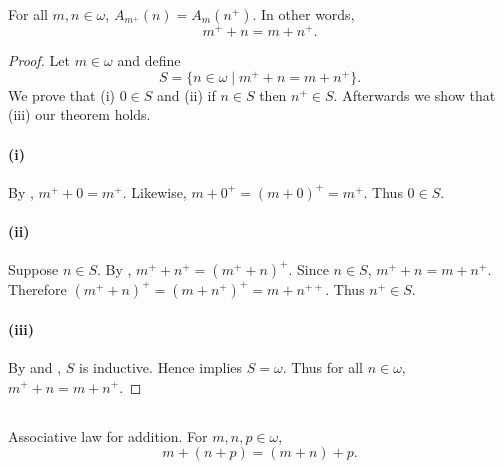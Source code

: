 \documentclass{report}
\begin{document}
\begin{lemma}

  For all $m, n \in \omega$, $A_{m^+}(n) = A_m(n^+)$.
  In other words, $$m^+ + n = m + n^+.$$

\end{lemma}

\begin{proof}


  Let $m \in \omega$ and define
    $$S = \{n \in \omega \mid m^+ + n = m + n^+\}.$$
  We prove that (i) $0 \in S$ and (ii) if $n \in S$ then $n^+ \in S$.
  Afterwards we show that (iii) our theorem holds.

  \paragraph{(i)}%

    By , $m^+ + 0 = m^+$.
    Likewise, $m + 0^+ = (m + 0)^+ = m^+$.
    Thus $0 \in S$.

  \paragraph{(ii)}%

    Suppose $n \in S$.
    By , $m^+ + n^+ = (m^+ + n)^+$.
    Since $n \in S$, $m^+ + n = m + n^+$.
    Therefore $(m^+ + n)^+ = (m + n^+)^+ = m + n^{++}$.
    Thus $n^+ \in S$.

  \paragraph{(iii)}%

    By  and , $S$ is inductive.
    Hence  implies $S = \omega$.
    Thus for all $n \in \omega$, $m^+ + n = m + n^+$.

\end{proof}

\subsection{}%
\label{sub:theorem-4k-1}

\begin{theorem}[4K-1]

  Associative law for addition.
  For $m, n, p \in \omega$, $$m + (n + p) = (m + n) + p.$$

\end{theorem}
\end{document}
